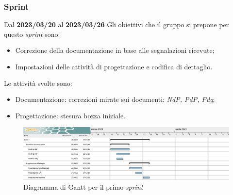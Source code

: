 \subsubsection{ Sprint}
Dal \textbf{2023/03/20} al \textbf{2023/03/26}
\newline
Gli obiettivi che il gruppo si prepone per questo \textit{sprint} sono:
\begin{itemize}
    \item Correzione della documentazione in base alle segnalazioni ricevute;
    \item Impostazioni delle attività di progettazione e codifica di dettaglio.
\end{itemize}
Le attività svolte sono:
\begin{itemize}
    \item Documentazione: correzioni mirate sui documenti: \textit{NdP, PdP, Pdq};
    \item Progettazione: stesura bozza iniziale.
\end{itemize}
\begin{figure}[H]
    \centering
    \includegraphics[width=\textwidth]{src/img/GanttSprint1.png}
    \caption{Diagramma di Gantt per il primo \textit{sprint}}
\end{figure}
